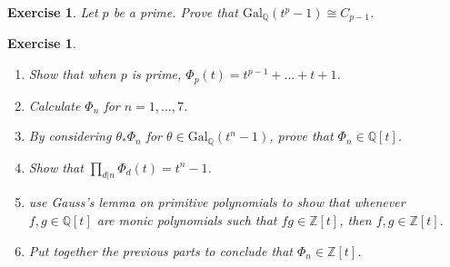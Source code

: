 \documentclass{article}
\newtheorem{exercise}[theorem]{Exercise}
\begin{document}
\begin{exercise}
Let $p$ be a prime. Prove that $\text{Gal}_\mathbb{Q}(t^p-1)\cong C_{p-1}$.
\end{exercise}

\begin{exercise}
\begin{enumerate}[label=(\roman*)]
    \item Show that when $p$ is prime, $\Phi_p(t)=t^{p-1}+...+t+1$.
    \item Calculate $\Phi_n$ for $n=1,...,7$.
    \item By considering $\theta_*\Phi_n$ for $\theta\in\text{Gal}_\mathbb{Q}(t^n-1)$, prove that $\Phi_n\in\mathbb{Q}[t]$.
    \item Show that $\prod_{d|n}\Phi_d(t)=t^n-1$.
    \item use Gauss's lemma on primitive polynomials to show that whenever $f,g\in\mathbb{Q}[t]$ are monic polynomials such that $fg\in\mathbb{Z}[t]$, then $f,g\in\mathbb{Z}[t]$.
    \item Put together the previous parts to conclude that $\Phi_n\in\mathbb{Z}[t]$.
\end{enumerate}
\end{exercise}
\end{document}
